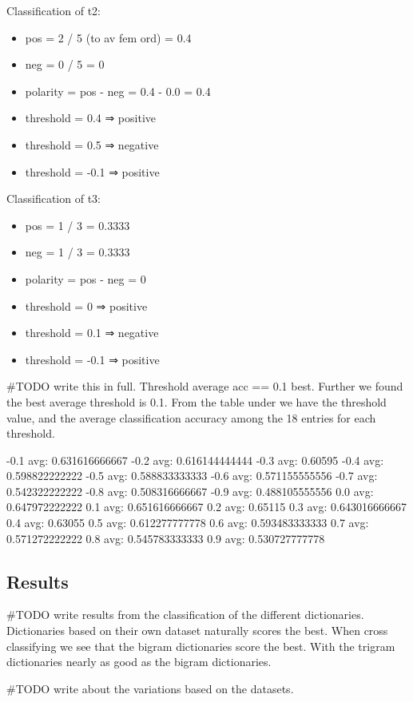 Classification of t2:
\begin{itemize}
    \item pos = 2 / 5 (to av fem ord) = 0.4
    \item neg = 0 / 5 = 0
    \item polarity = pos - neg = 0.4 - 0.0 = 0.4
    \item threshold = 0.4 ⇒ positive
    \item threshold = 0.5 ⇒ negative
    \item threshold = -0.1 ⇒ positive
\end{itemize}

Classification of t3:
\begin{itemize}
    \item pos = 1 / 3 = 0.3333
    \item neg = 1 / 3 = 0.3333
    \item polarity = pos - neg = 0
    \item threshold = 0 ⇒ positive
    \item threshold = 0.1 ⇒ negative
    \item threshold = -0.1 ⇒ positive
\end{itemize}

#TODO write this in full. Threshold average acc == 0.1 best. 
Further we found the best average threshold is 0.1.
From the table under we have the threshold value, and the average
classification accuracy among the 18 entries for each threshold. 

-0.1 avg: 0.631616666667
-0.2 avg: 0.616144444444
-0.3 avg: 0.60595
-0.4 avg: 0.598822222222
-0.5 avg: 0.588833333333
-0.6 avg: 0.571155555556
-0.7 avg: 0.542322222222
-0.8 avg: 0.508316666667
-0.9 avg: 0.488105555556
0.0 avg: 0.647972222222
0.1 avg: 0.651616666667
0.2 avg: 0.65115
0.3 avg: 0.643016666667
0.4 avg: 0.63055
0.5 avg: 0.612277777778
0.6 avg: 0.593483333333
0.7 avg: 0.571272222222
0.8 avg: 0.545783333333
0.9 avg: 0.530727777778

\subsection{Results}
#TODO write results from the classification of the different dictionaries. \\
Dictionaries based on their own dataset naturally scores the best. When cross
classifying we see that the bigram dictionaries score the best. With the
trigram dictionaries nearly as good as the bigram dictionaries.

#TODO write about the variations based on the datasets. \\

